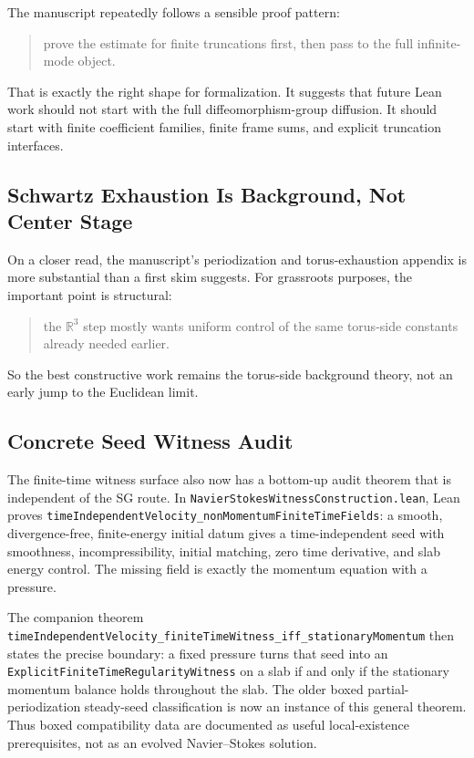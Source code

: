 \documentclass[11pt]{article}
\theoremstyle{remark}
\begin{document}
The manuscript repeatedly follows a sensible proof pattern:
\begin{quote}
prove the estimate for finite truncations first, then pass to the full
infinite-mode object.
\end{quote}

That is exactly the right shape for formalization.  It suggests that future Lean
work should not start with the full diffeomorphism-group diffusion.  It should
start with finite coefficient families, finite frame sums, and explicit
truncation interfaces.

\subsection{Schwartz Exhaustion Is Background, Not Center Stage}

On a closer read, the manuscript's periodization and torus-exhaustion appendix
is more substantial than a first skim suggests.  For grassroots purposes, the
important point is structural:
\begin{quote}
the \(\mathbb{R}^3\) step mostly wants uniform control of the same torus-side
constants already needed earlier.
\end{quote}

So the best constructive work remains the torus-side background theory, not an
early jump to the Euclidean limit.

\subsection{Concrete Seed Witness Audit}

The finite-time witness surface also now has a bottom-up audit theorem that is
independent of the SG route.  In
\texttt{NavierStokesWitnessConstruction.lean}, Lean proves
\texttt{timeIndependentVelocity\_nonMomentumFiniteTimeFields}: a smooth,
divergence-free, finite-energy initial datum gives a time-independent seed with
smoothness, incompressibility, initial matching, zero time derivative, and slab
energy control.  The missing field is exactly the momentum equation with a
pressure.

The companion theorem
\texttt{timeIndependentVelocity\_finiteTimeWitness\_iff\_stationaryMomentum}
then states the precise boundary: a fixed pressure turns that seed into an
\texttt{ExplicitFiniteTimeRegularityWitness} on a slab if and only if the
stationary momentum balance holds throughout the slab.  The older boxed
partial-periodization steady-seed classification is now an instance of this
general theorem.  Thus boxed compatibility data are documented as useful
local-existence prerequisites, not as an evolved Navier--Stokes solution.
\end{document}
